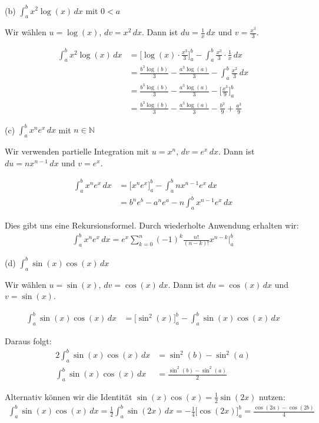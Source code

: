 \documentclass{article}
\begin{document}
(b) $\int_a^b x^2\log(x)\,dx$ mit $0 < a$

Wir wählen $u = \log(x)$, $dv = x^2\,dx$. Dann ist $du = \frac{1}{x}\,dx$ und $v = \frac{x^3}{3}$.

\begin{align}
\int_a^b x^2\log(x)\,dx &= \Big[\log(x) \cdot \frac{x^3}{3}\Big]_a^b - \int_a^b \frac{x^3}{3} \cdot \frac{1}{x}\,dx \\
&= \frac{b^3\log(b)}{3} - \frac{a^3\log(a)}{3} - \int_a^b \frac{x^2}{3}\,dx \\
&= \frac{b^3\log(b)}{3} - \frac{a^3\log(a)}{3} - \Big[\frac{x^3}{9}\Big]_a^b \\
&= \frac{b^3\log(b)}{3} - \frac{a^3\log(a)}{3} - \frac{b^3}{9} + \frac{a^3}{9}
\end{align}

(c) $\int_a^b x^n e^x\,dx$ mit $n \in \mathbb{N}$

Wir verwenden partielle Integration mit $u = x^n$, $dv = e^x\,dx$. Dann ist $du = nx^{n-1}\,dx$ und $v = e^x$.

\begin{align}
\int_a^b x^n e^x\,dx &= \Big[x^n e^x\Big]_a^b - \int_a^b nx^{n-1}e^x\,dx \\
&= b^n e^b - a^n e^a - n\int_a^b x^{n-1}e^x\,dx
\end{align}

Dies gibt uns eine Rekursionsformel. Durch wiederholte Anwendung erhalten wir:
\begin{align}
\int_a^b x^n e^x\,dx = e^x \sum_{k=0}^{n} (-1)^k \frac{n!}{(n-k)!} x^{n-k} \Big|_a^b
\end{align}

(d) $\int_a^b \sin(x)\cos(x)\,dx$

Wir wählen $u = \sin(x)$, $dv = \cos(x)\,dx$. Dann ist $du = \cos(x)\,dx$ und $v = \sin(x)$.

\begin{align}
\int_a^b \sin(x)\cos(x)\,dx &= \Big[\sin^2(x)\Big]_a^b - \int_a^b \sin(x)\cos(x)\,dx
\end{align}

Daraus folgt:
\begin{align}
2\int_a^b \sin(x)\cos(x)\,dx &= \sin^2(b) - \sin^2(a) \\
\int_a^b \sin(x)\cos(x)\,dx &= \frac{\sin^2(b) - \sin^2(a)}{2}
\end{align}

Alternativ können wir die Identität $\sin(x)\cos(x) = \frac{1}{2}\sin(2x)$ nutzen:
\begin{align}
\int_a^b \sin(x)\cos(x)\,dx = \frac{1}{2}\int_a^b \sin(2x)\,dx = -\frac{1}{4}\Big[\cos(2x)\Big]_a^b = \frac{\cos(2a) - \cos(2b)}{4}
\end{align}
\end{document}
